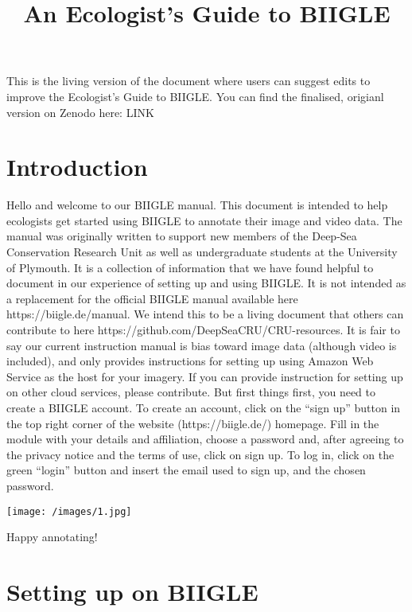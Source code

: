 \documentclass[
  letterpaper,
  DIV=11,
  numbers=noendperiod]{scrartcl}
\title{An Ecologist's Guide to BIIGLE}
\author{}
\date{}
\begin{document}
\maketitle
\ifdefined\Shaded\renewenvironment{Shaded}{\begin{tcolorbox}[breakable, boxrule=0pt, sharp corners, enhanced, borderline west={3pt}{0pt}{shadecolor}, frame hidden, interior hidden]}{\end{tcolorbox}}\fi

This is the living version of the document where users can suggest edits
to improve the Ecologist's Guide to BIIGLE. You can find the finalised,
origianl version on Zenodo here: LINK

\hypertarget{introduction}{%
\section{Introduction}\label{introduction}}

Hello and welcome to our BIIGLE manual. This document is intended to
help ecologists get started using BIIGLE to annotate their image and
video data. The manual was originally written to support new members of
the Deep-Sea Conservation Research Unit as well as undergraduate
students at the University of Plymouth. It is a collection of
information that we have found helpful to document in our experience of
setting up and using BIIGLE. It is not intended as a replacement for the
official BIIGLE manual available here https://biigle.de/manual. We
intend this to be a living document that others can contribute to here
https://github.com/DeepSeaCRU/CRU-resources. It is fair to say our
current instruction manual is bias toward image data (although video is
included), and only provides instructions for setting up using Amazon
Web Service as the host for your imagery. If you can provide instruction
for setting up on other cloud services, please contribute. But first
things first, you need to create a BIIGLE account. To create an account,
click on the ``sign up'' button in the top right corner of the website
(https://biigle.de/) homepage. Fill in the module with your details and
affiliation, choose a password and, after agreeing to the privacy notice
and the terms of use, click on sign up. To log in, click on the green
``login'' button and insert the email used to sign up, and the chosen
password.

\texttt{[image: /images/1.jpg]}

Happy annotating!

\hypertarget{setting-up-on-biigle}{%
\section{Setting up on BIIGLE}\label{setting-up-on-biigle}}
\end{document}
